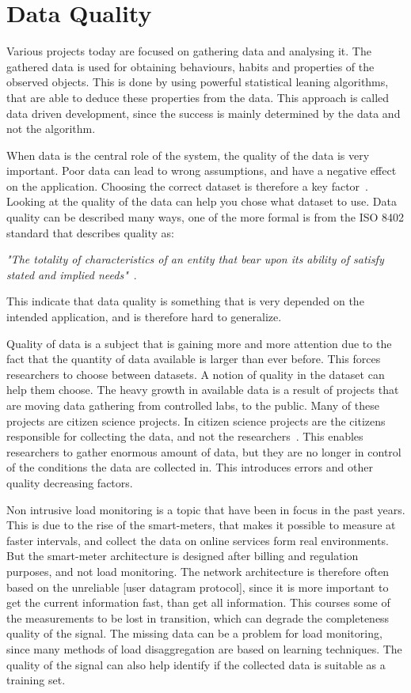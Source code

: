 \chapter{Data Quality}
\label{Sec:DataQuality}
Various projects today are focused on gathering data and analysing it. The gathered data is used for obtaining behaviours, habits and properties of the observed objects. This is done by using powerful statistical leaning algorithms, that are able to deduce these properties from the data. This approach is called data driven development, since the success is mainly determined by the data and not the algorithm. 

When data is the central role of the system, the quality of the data is very important. Poor data can lead to wrong assumptions, and have a negative effect on the application. Choosing the correct dataset is therefore a key factor~\cite{RefWorks:3}. Looking at the quality of the data can help you chose what dataset to use. Data quality can be described many ways, one of the more formal is from the ISO 8402 standard that describes quality as: 

\begin{adjustwidth}{2.5em}{2.5em}
\emph{"The totality of characteristics of an entity that bear upon its ability of satisfy stated and implied needs"}~\cite{RefWorks:5}.
\end{adjustwidth}

This indicate that data quality is something that is very depended on the intended application, and is therefore hard to generalize. 

Quality of data is a subject that is gaining more and more attention due to the fact that the quantity of data available is larger than ever before. This forces researchers to choose between datasets. A notion of quality in the dataset can help them choose. The heavy growth in available data is a result of projects that are moving data gathering from controlled labs, to the public. Many of these projects are citizen science projects. In citizen science projects are the citizens responsible for collecting the data, and not the researchers~\cite{RefWorks:2}. This enables researchers to gather enormous amount of data, but they are no longer in control of the conditions the data are collected in. This introduces errors and other quality decreasing factors. 

Non intrusive load monitoring is a topic that have been in focus in the past years. This is due to the rise of the smart-meters, that makes it possible to measure at faster intervals, and collect the data on online services form real environments. But the smart-meter architecture is designed after billing and regulation purposes, and not load monitoring. The network architecture is therefore often based on the unreliable [user datagram protocol], since it is more important to get the current information fast, than get all information. This courses some of the measurements to be lost in transition, which can degrade the completeness quality of the signal. The missing data can be a problem for load monitoring, since many methods of load disaggregation are based on learning techniques. The quality of the signal can also help identify if the collected data is suitable as a training set. 


